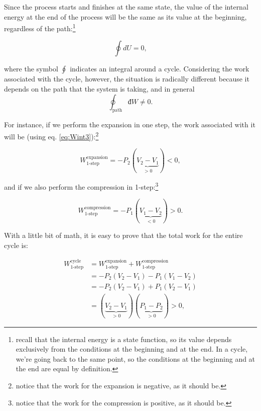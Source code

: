 \documentclass[
  9pt,
]{extbook}
\theoremstyle{definition}
\theoremstyle{definition}
\theoremstyle{definition}
\theoremstyle{remark}
\begin{document}
Since the process starts and finishes at the same state, the value of the internal energy at the end of the process will be the same as its value at the beginning, regardless of the path:\footnote{recall that the internal energy is a state function, so its value depends exclusively from the conditions at the beginning and at the end. In a cycle, we're going back to the same point, so the conditions at the beginning and at the end are equal by definition.}

\begin{equation}
  \oint dU=0,
  \label{eq:de0}
\end{equation}

where the symbol \(\oint\) indicates an integral around a cycle. Considering the work associated with the cycle, however, the situation is radically different because it depends on the path that the system is taking, and in general
\begin{equation}
\oint_{\text{path}} đW \neq 0.
  \label{eq:dw0}
\end{equation}

For instance, if we perform the expansion in one step, the work associated with it will be (using eq. \eqref{eq:Wint3}):\footnote{notice that the work for the expansion is negative, as it should be.}

\begin{equation}
  W^{\text{expansion}}_{\text{1-step}}=-P_2(\underbrace{V_2-V_1}_{>0})<0,
  \label{eq:Wexp1}
\end{equation}

and if we also perform the compression in 1-step:\footnote{notice that the work for the compression is positive, as it should be.}

\begin{equation}
  W^{\text{compression}}_{\text{1-step}}=-P_1(\underbrace{V_1-V_2}_{<0})>0.
  \label{eq:Wcomp1}
\end{equation}

With a little bit of math, it is easy to prove that the total work for the entire cycle is:

\begin{equation}
\begin{aligned}
W^{\text{cycle}}_{\text{1-step}} {} & =  W^{\text{expansion}}_{\text{1-step}}+W^{\text{compression}}_{\text{1-step}} \\
 & = -P_2(V_2-V_1)-P_1(V_1-V_2) \\
 & = -P_2(V_2-V_1)+P_1(V_2-V_1) \\
 & = (\underbrace{V_2-V_1}_{>0})(\underbrace{P_1-P_2}_{>0}) > 0,
\end{aligned}
  \label{eq:Wtot1}
\end{equation}
\end{document}
